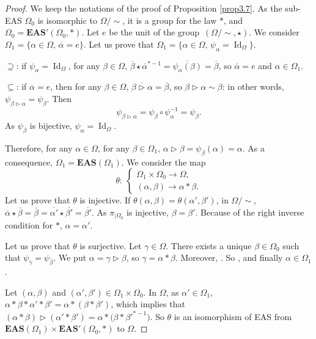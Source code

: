 \documentclass[pdftex]{sigma}
\numberwithin{equation}{section}
\newcommand{\eas}{\mathbf{EAS}}
\begin{document}
\begin{proof}
We keep the notations of the proof of Proposition \ref{prop3.7}. As the sub-EAS $\Omega_0$ is isomorphic to $\Omega/{\sim}$, it is a group for the law $*$, and $\Omega_0=\eas'(\Omega_0,*)$.
Let $e$ be the unit of the group~$(\Omega/{\sim},\star)$. We consider
$\Omega_1=\{\alpha\in \Omega,\, \overline{\alpha}=e\}$.
Let us prove that $\Omega_1=\{\alpha \in \Omega,\, \psi_\alpha=\operatorname{Id}_\Omega\}$.

$\supseteq$: if $\psi_\alpha=\operatorname{Id}_\Omega$, for any $\beta \in \Omega$, $\overline{\beta} \star \overline{\alpha}^{*-1}=\overline{\psi_\alpha(\beta)}=\overline{\beta}$, so $\overline{\alpha}=e$ and $\alpha \in \Omega_1$.

$\subseteq$: if $\overline{\alpha}=e$, then for any $\beta \in \Omega$, $\overline{\beta \triangleright \alpha}=\overline{\beta}$, so $\beta \triangleright \alpha\sim \beta$: in other words, $\psi_{\beta \triangleright \alpha}=\psi_\beta$. Then
\[\psi_{\beta \triangleright \alpha}=\psi_\beta \circ \psi_{\alpha}^{-1}=\psi_\beta.\]
As $\psi_\beta$ is bijective, $\psi_\alpha=\operatorname{Id}_\Omega$.

Therefore, for any $\alpha \in \Omega$, for any $\beta \in \Omega_1$,
$\alpha \triangleright \beta=\psi_\beta(\alpha)=\alpha$.
As a consequence, $\Omega_1=\eas(\Omega_1)$. We consider the map
\[\theta\colon\ \begin{cases}
\Omega_1\times \Omega_0 \longrightarrow \Omega,\\
(\alpha,\beta) \longrightarrow \alpha*\beta.
\end{cases}\]
Let us prove that $\theta$ is injective. If $\theta(\alpha,\beta)=\theta(\alpha',\beta')$, in $\Omega/{\sim}$,
$\overline{\alpha}\star \overline{\beta}=\overline{\beta}=\overline{\alpha'}\star \overline{\beta'}=\overline{\beta'}$.
As $\pi_{\mid \Omega_0}$ is injective, $\beta=\beta'$. Because of the right inverse condition for $*$, $\alpha=\alpha'$.

Let us prove that $\theta$ is surjective. Let $\gamma \in \Omega$. There exists a unique $\beta\in \Omega_0$ such that $\psi_{\overline{\gamma}}=\psi_{\overline{\beta}}$.
We put $\alpha=\gamma \triangleright \beta$, so $\gamma=\alpha*\beta$. Moreover,
.
So , and finally $\alpha\in \Omega_1$.

Let $(\alpha,\beta)$ and $(\alpha',\beta')\in \Omega_1 \times \Omega_0$. In $\Omega$, as $\alpha'\in \Omega_1$,
$\alpha*\beta*\alpha'*\beta'=\alpha*(\beta*\beta')$,
which implies that~${(\alpha*\beta)\triangleright (\alpha'*\beta')=\alpha* \bigl(\beta*\beta'^{*-1}\bigr)}$.
So $\theta$ is an isomorphism of EAS from $\eas(\Omega_1)\times \eas'(\Omega_0,*)$ to $\Omega$.
\end{proof}
\end{document}
